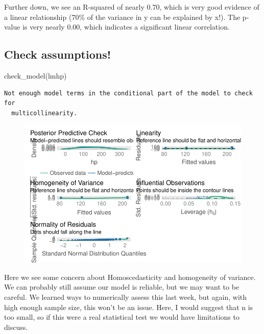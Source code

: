 \documentclass[
  letterpaper,
  DIV=11,
  numbers=noendperiod]{scrartcl}
\newenvironment{Shaded}{\begin{snugshade}}{\end{snugshade}}
\newcommand{\FunctionTok}[1]{\textcolor[rgb]{0.28,0.35,0.67}{#1}}
\newcommand{\NormalTok}[1]{\textcolor[rgb]{0.00,0.23,0.31}{#1}}
\begin{document}
Further down, we see an R-squared of nearly 0.70, which is very good
evidence of a linear relationship (70\% of the variance in y can be
explained by x!). The p-value is very nearly 0.00, which indicates a
significant linear correlation.

\subsection{\texorpdfstring{\textbf{Check
assumptions!}}{Check assumptions!}}

\begin{Shaded}
\begin{Highlighting}[]
\FunctionTok{check\_model}\NormalTok{(lmhp)}
\end{Highlighting}
\end{Shaded}

\begin{verbatim}
Not enough model terms in the conditional part of the model to check for
  multicollinearity.
\end{verbatim}

\begin{figure}[H]

{\centering \includegraphics{cor_reg_chi_files/figure-pdf/unnamed-chunk-19-1.pdf}

}

\end{figure}

\hfill\break
Here we see some concern about Homoscedasticity and homogeneity of
variance. We can probably still assume our model is reliable, but we may
want to be careful. We learned ways to numerically assess this last
week, but again, with high enough sample size, this won't be an issue.
Here, I would suggest that n is too small, so if this were a real
statistical test we would have limitations to discuss.\\
\end{document}

